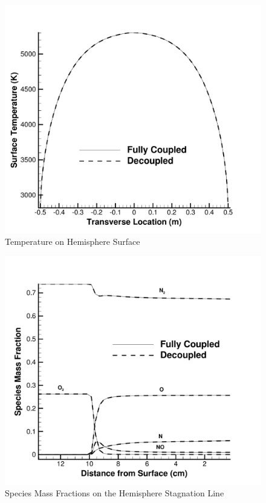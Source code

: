 \documentclass[]{aiaa-tc}%
\begin{document}
\begin{figure}
\begin{center}
\includegraphics{surface_temperature}
\caption{Temperature on Hemisphere Surface}
\label{surf_temp}
\end{center}
\end{figure}
%
\begin{figure}
\begin{center}
\includegraphics{stag_line_mf}
\caption{Species Mass Fractions on the Hemisphere Stagnation Line}
\label{stag_line}
\end{center}
\end{figure}
\end{document}
